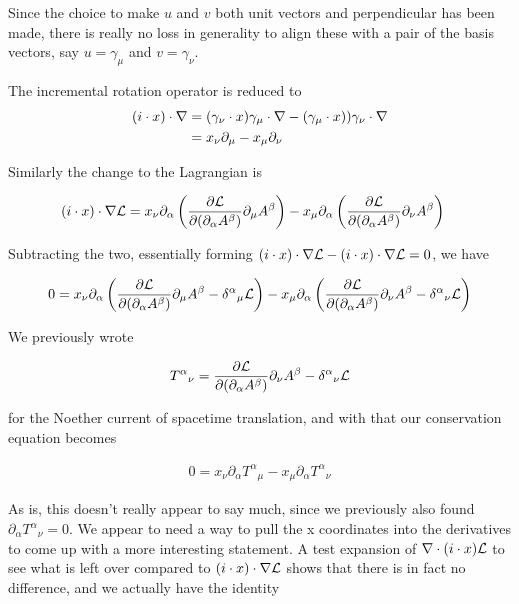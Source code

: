 Since the choice to make $u$ and $v$ both unit vectors and perpendicular has been made, there is really no loss in generality to align these with a pair of the basis vectors, say $u = \gamma_\mu$ and $v = \gamma_\nu$.

The incremental rotation operator is reduced to
\begin{align*}
(i \cdot x) \cdot \nabla 
&=
(\gamma_\nu \cdot x) \gamma_\mu \cdot \nabla - (\gamma_\mu \cdot x)) \gamma_\nu \cdot \nabla \\
&=
x_\nu \partial_\mu - x_\mu \partial_\nu \\
\end{align*}

Similarly the change to the Lagrangian is

\begin{align}\label{eqn:rotationCurrents:foo5}
(i \cdot x) \cdot \nabla \mathcal{L}
&=
x_\nu
\partial_\alpha \left(
\frac{\partial {\mathcal{L}}}{\partial {(\partial_\alpha A^\beta)}} \partial_\mu {A^\beta}
\right) 
-
x_\mu
\partial_\alpha \left(
\frac{\partial {\mathcal{L}}}{\partial {(\partial_\alpha A^\beta)}} \partial_\nu {A^\beta}
\right) 
\end{align}

Subtracting the two, essentially forming $(i \cdot x) \cdot \nabla \mathcal{L} - (i \cdot x) \cdot \nabla \mathcal{L} = 0$, we have

\begin{align}\label{eqn:rotationCurrents:foo6}
0 =
x_\nu
\partial_\alpha \left(
\frac{\partial {\mathcal{L}}}{\partial {(\partial_\alpha A^\beta)}} \partial_\mu {A^\beta}
- {\delta^\alpha}_\mu \mathcal{L}
\right) 
-
x_\mu
\partial_\alpha \left(
\frac{\partial {\mathcal{L}}}{\partial {(\partial_\alpha A^\beta)}} \partial_\nu {A^\beta}
- {\delta^\alpha}_\nu \mathcal{L}
\right) 
\end{align}

We previously wrote 

\begin{align*}
{T^\alpha}_\nu &= \frac{\partial {\mathcal{L}}}{\partial {(\partial_\alpha A^\beta)}} \partial_\nu A^\beta - {\delta^\alpha}_\nu \mathcal{L} \\
\end{align*}

for the Noether current of spacetime translation, and with that our conservation equation becomes

\begin{align}\label{eqn:rotationCurrents:foo7}
0 = x_\nu \partial_\alpha {T^\alpha}_\mu - x_\mu \partial_\alpha {T^\alpha}_\nu
\end{align}

As is, this doesn't really appear to say much, since we previously also found $\partial_\alpha {T^\alpha}_\nu = 0$.  We appear to need a way to pull the x coordinates into the derivatives to come up with a more interesting statement.  A test expansion of $\nabla \cdot (i \cdot x) \mathcal{L}$ to see what is left over compared to $(i \cdot x) \cdot \nabla \mathcal{L}$ shows that there is in fact no difference, and we actually have the identity

